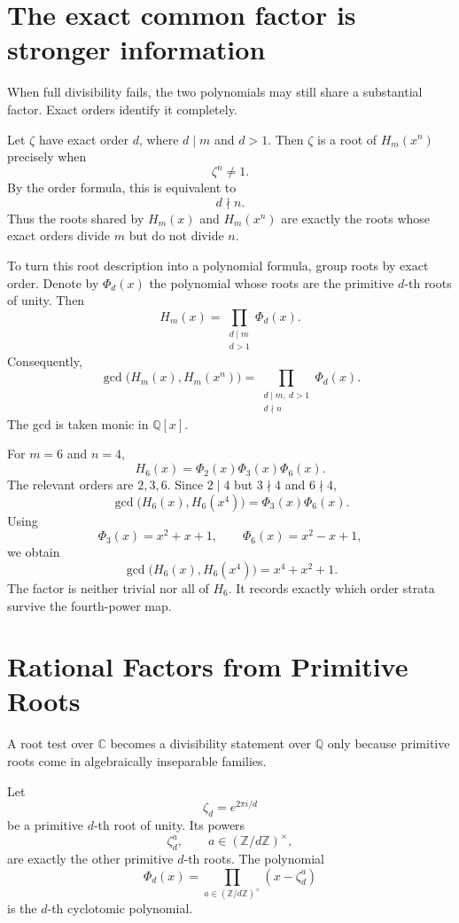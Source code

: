 \section{The exact common factor is stronger information}

When full divisibility fails, the two polynomials may still share a substantial factor.  Exact orders identify it completely.

Let \(\zeta\) have exact order \(d\), where \(d\mid m\) and \(d>1\).  Then \(\zeta\) is a root of \(H_m(x^n)\) precisely when
\[
  \zeta^n\neq1.
\]
By the order formula, this is equivalent to
\[
  d\nmid n.
\]
Thus the roots shared by \(H_m(x)\) and \(H_m(x^n)\) are exactly the roots whose exact orders divide \(m\) but do not divide \(n\).

To turn this root description into a polynomial formula, group roots by exact order.  Denote by \(\Phi_d(x)\) the polynomial whose roots are the primitive \(d\)-th roots of unity.  Then
\[
  H_m(x)=\prod_{\substack{d\mid m\\d>1}}\Phi_d(x).
\]
Consequently,
\[
  \boxed{
  \gcd\bigl(H_m(x),H_m(x^n)\bigr)
  =
  \prod_{\substack{d\mid m,\ d>1\\d\nmid n}}
  \Phi_d(x).}
\]
The gcd is taken monic in \(\mathbb Q[x]\).

For \(m=6\) and \(n=4\),
\[
  H_6(x)=\Phi_2(x)\Phi_3(x)\Phi_6(x).
\]
The relevant orders are \(2,3,6\).  Since \(2\mid4\) but \(3\nmid4\) and \(6\nmid4\),
\[
  \gcd\bigl(H_6(x),H_6(x^4)\bigr)
  =\Phi_3(x)\Phi_6(x).
\]
Using
\[
  \Phi_3(x)=x^2+x+1,
  \qquad
  \Phi_6(x)=x^2-x+1,
\]
we obtain
\[
  \gcd\bigl(H_6(x),H_6(x^4)\bigr)
  =x^4+x^2+1.
\]
The factor is neither trivial nor all of \(H_6\).  It records exactly which order strata survive the fourth-power map.

\section{Rational Factors from Primitive Roots}

A root test over \(\mathbb C\) becomes a divisibility statement over \(\mathbb Q\) only because primitive roots come in algebraically inseparable families.

Let
\[
  \zeta_d=e^{2\pi i/d}
\]
be a primitive \(d\)-th root of unity.  Its powers
\[
  \zeta_d^a,
  \qquad
  a\in(\mathbb Z/d\mathbb Z)^\times,
\]
are exactly the other primitive \(d\)-th roots.  The polynomial
\[
  \Phi_d(x)
  =
  \prod_{a\in(\mathbb Z/d\mathbb Z)^\times}
  (x-\zeta_d^a)
\]
is the \(d\)-th cyclotomic polynomial.

